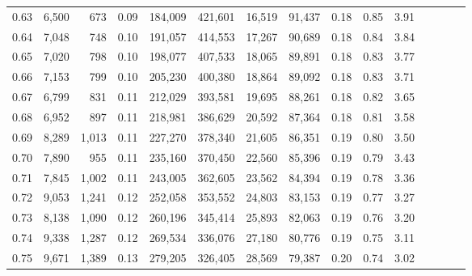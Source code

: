 \begin{tabular}{rrrcrrrrrrrrrrr}
0.63 &   6,500 &    673 &                                       0.09 &  184,009 &  421,601 &   16,519 &   91,437 &  0.18 &  0.85 &                         3.91 \\
0.64 &   7,048 &    748 &                                       0.10 &  191,057 &  414,553 &   17,267 &   90,689 &  0.18 &  0.84 &                         3.84 \\
0.65 &   7,020 &    798 &                                       0.10 &  198,077 &  407,533 &   18,065 &   89,891 &  0.18 &  0.83 &                         3.77 \\
0.66 &   7,153 &    799 &                                       0.10 &  205,230 &  400,380 &   18,864 &   89,092 &  0.18 &  0.83 &                         3.71 \\
0.67 &   6,799 &    831 &                                       0.11 &  212,029 &  393,581 &   19,695 &   88,261 &  0.18 &  0.82 &                         3.65 \\
0.68 &   6,952 &    897 &                                       0.11 &  218,981 &  386,629 &   20,592 &   87,364 &  0.18 &  0.81 &                         3.58 \\
0.69 &   8,289 &  1,013 &                                       0.11 &  227,270 &  378,340 &   21,605 &   86,351 &  0.19 &  0.80 &                         3.50 \\
0.70 &   7,890 &    955 &                                       0.11 &  235,160 &  370,450 &   22,560 &   85,396 &  0.19 &  0.79 &                         3.43 \\
0.71 &   7,845 &  1,002 &                                       0.11 &  243,005 &  362,605 &   23,562 &   84,394 &  0.19 &  0.78 &                         3.36 \\
0.72 &   9,053 &  1,241 &                                       0.12 &  252,058 &  353,552 &   24,803 &   83,153 &  0.19 &  0.77 &                         3.27 \\
0.73 &   8,138 &  1,090 &                                       0.12 &  260,196 &  345,414 &   25,893 &   82,063 &  0.19 &  0.76 &                         3.20 \\
0.74 &   9,338 &  1,287 &                                       0.12 &  269,534 &  336,076 &   27,180 &   80,776 &  0.19 &  0.75 &                         3.11 \\
0.75 &   9,671 &  1,389 &                                       0.13 &  279,205 &  326,405 &   28,569 &   79,387 &  0.20 &  0.74 &                         3.02 \\

\end{tabular}
